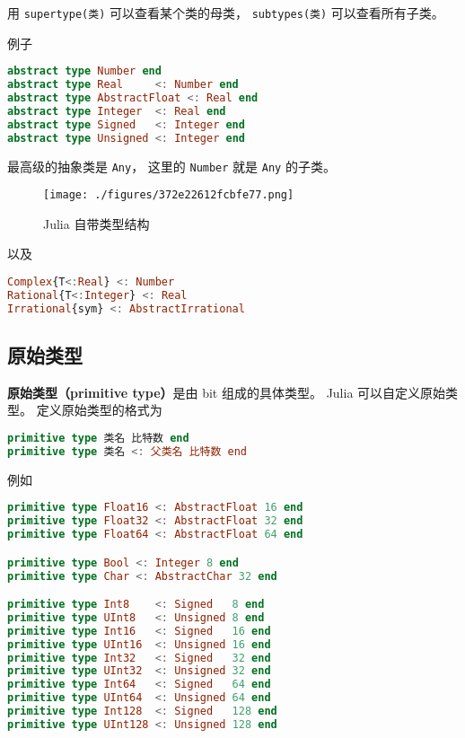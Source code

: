 用 \verb`supertype(类)` 可以查看某个类的母类， \verb`subtypes(类)` 可以查看所有子类。

例子
\begin{lstlisting}[language=julia]
abstract type Number end
abstract type Real     <: Number end
abstract type AbstractFloat <: Real end
abstract type Integer  <: Real end
abstract type Signed   <: Integer end
abstract type Unsigned <: Integer end
\end{lstlisting}
最高级的抽象类是 \verb`Any`， 这里的 \verb`Number` 就是 \verb`Any` 的子类。

\begin{figure}[ht]
\centering
\texttt{[image: ./figures/372e22612fcbfe77.png]}
\caption{Julia 自带类型结构} \label{fig_JuType_1}
\end{figure}
以及
\begin{lstlisting}[language=julia]
Complex{T<:Real} <: Number
Rational{T<:Integer} <: Real
Irrational{sym} <: AbstractIrrational
\end{lstlisting}


\subsection{原始类型}
\textbf{原始类型（primitive type）}是由 bit 组成的具体类型。 Julia 可以自定义原始类型。 定义原始类型的格式为
\begin{lstlisting}[language=julia]
primitive type 类名 比特数 end
primitive type 类名 <: 父类名 比特数 end
\end{lstlisting}
例如
\begin{lstlisting}[language=julia]
primitive type Float16 <: AbstractFloat 16 end
primitive type Float32 <: AbstractFloat 32 end
primitive type Float64 <: AbstractFloat 64 end

primitive type Bool <: Integer 8 end
primitive type Char <: AbstractChar 32 end

primitive type Int8    <: Signed   8 end
primitive type UInt8   <: Unsigned 8 end
primitive type Int16   <: Signed   16 end
primitive type UInt16  <: Unsigned 16 end
primitive type Int32   <: Signed   32 end
primitive type UInt32  <: Unsigned 32 end
primitive type Int64   <: Signed   64 end
primitive type UInt64  <: Unsigned 64 end
primitive type Int128  <: Signed   128 end
primitive type UInt128 <: Unsigned 128 end
\end{lstlisting}

